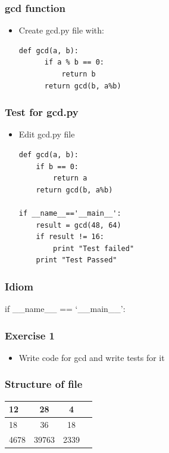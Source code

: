 \documentclass[presentation]{beamer}
\begin{document}
\begin{frame}[fragile]
\frametitle{gcd function}
\label{sec-4}


\begin{itemize}
\item Create gcd.py file with:
\lstset{language=Python}
\begin{lstlisting}
def gcd(a, b):
      if a % b == 0: 
          return b
      return gcd(b, a%b)
\end{lstlisting}
\end{itemize}
\end{frame}
\begin{frame}[fragile]
\frametitle{Test for gcd.py}
\label{sec-5}


\begin{itemize}
\item Edit gcd.py file
\lstset{language=Python}
\begin{lstlisting}
def gcd(a, b):
    if b == 0:
        return a
    return gcd(b, a%b)

if __name__=='__main__':
    result = gcd(48, 64)
    if result != 16:
        print "Test failed"
    print "Test Passed"
\end{lstlisting}
\end{itemize}
\end{frame}
\begin{frame}
\frametitle{Idiom}
\label{sec-6}

if \_\_name\_\_ == `\_\_main\_\_':
\end{frame}
\begin{frame}
\frametitle{Exercise 1}
\label{sec-7}


\begin{itemize}
\item Write code for gcd and write tests for it
\end{itemize}
\end{frame}
\begin{frame}
\frametitle{Structure of file}
\label{sec-8}


\begin{center}
\begin{tabular}{|l|c|c|c}
\hline
   12    &   28     &  4  \\
\hline   
   18    &   36     &  18  \\
\hline   
   4678  &   39763  &  2339  \\
\hline 
\end{tabular}
\end{center}
\end{frame}
\end{document}
